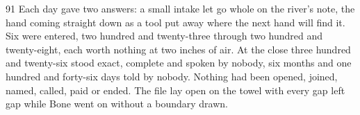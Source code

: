 \begin{CRchronicle}{91}
Each day gave two answers: a small intake let go whole on the river’s note, the hand coming straight down as a tool put away where the next hand will find it. Six were entered, two hundred and twenty-three through two hundred and twenty-eight, each worth nothing at two inches of air. At the close three hundred and twenty-six stood exact, complete and spoken by nobody, six months and one hundred and forty-six days told by nobody. Nothing had been opened, joined, named, called, paid or ended. The file lay open on the towel with every gap left gap while Bone went on without a boundary drawn.
\end{CRchronicle}
